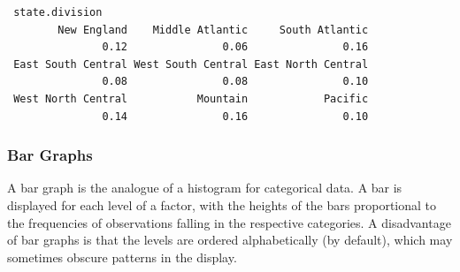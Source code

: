 \documentclass[captions=tableheading]{scrbook}
\begin{document}
\begin{verbatim}
 state.division
        New England    Middle Atlantic     South Atlantic 
               0.12               0.06               0.16 
 East South Central West South Central East North Central 
               0.08               0.08               0.10 
 West North Central           Mountain            Pacific 
               0.14               0.16               0.10
\end{verbatim}
\subsubsection{Bar Graphs}
\label{sec-2-1-4-2}
\label{par:Bar-Graphs}


A bar graph is the analogue of a histogram for categorical data. A bar is displayed for each level of a factor, with the heights of the bars proportional to the frequencies of observations falling in the respective categories. A disadvantage of bar graphs is that the levels are ordered alphabetically (by default), which may sometimes obscure patterns in the display. 
\end{document}
